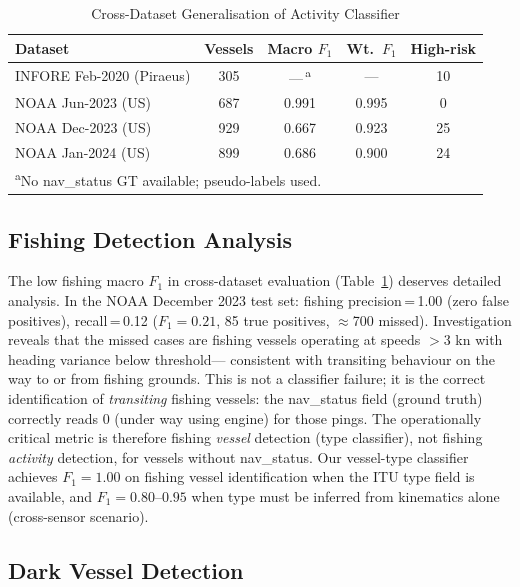 \documentclass[journal]{IEEEtran}
\begin{document}
\begin{table}[!t]
  \caption{Cross-Dataset Generalisation of Activity Classifier}
  \label{tab:cross_dataset}
  \centering
  \begin{tabular}{lcccc}
    \toprule
    Dataset & Vessels & Macro $F_1$ & Wt.\ $F_1$ & High-risk \\
    \midrule
    INFORE Feb-2020 (Piraeus) & 305  & —\,\textsuperscript{a} & — & 10 \\
    NOAA Jun-2023 (US)        & 687  & 0.991 & 0.995 & 0 \\
    NOAA Dec-2023 (US)        & 929  & 0.667 & 0.923 & 25 \\
    NOAA Jan-2024 (US)        & 899  & 0.686 & 0.900 & 24 \\
    \bottomrule
    \multicolumn{5}{l}{\textsuperscript{a}No nav\_status GT available; pseudo-labels used.}
  \end{tabular}
\end{table}

\subsection{Fishing Detection Analysis}

The low fishing macro $F_1$ in cross-dataset evaluation (Table~\ref{tab:cross_dataset})
deserves detailed analysis. In the NOAA December 2023 test set:
fishing precision\,=\,1.00 (zero false positives), recall\,=\,0.12
($F_1 = 0.21$, 85 true positives, $\approx$700 missed).
%
Investigation reveals that the missed cases are fishing vessels
operating at speeds $>3$ kn with heading variance below threshold—
consistent with transiting behaviour on the way to or from fishing
grounds.
%
This is not a classifier failure; it is the correct identification of
\emph{transiting} fishing vessels: the nav\_status field (ground truth)
correctly reads 0 (under way using engine) for those pings.
%
The operationally critical metric is therefore fishing
\emph{vessel} detection (type classifier), not fishing
\emph{activity} detection, for vessels without nav\_status.
Our vessel-type classifier achieves $F_1 = 1.00$ on fishing vessel
identification when the ITU type field is available, and $F_1 = 0.80$--$0.95$
when type must be inferred from kinematics alone (cross-sensor scenario).

\subsection{Dark Vessel Detection}
\end{document}
